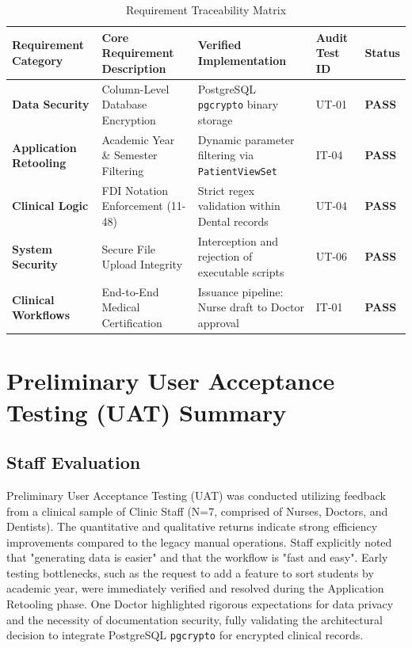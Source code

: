 \begin{table}[htbp]
\centering
\caption{Requirement Traceability Matrix}
\begin{tabular}{|p{}|p{}|p{}|p{}|p{}|}
\hline
\textbf{Requirement Category} & \textbf{Core Requirement Description} & \textbf{Verified Implementation} & \textbf{Audit Test ID} & \textbf{Status} \\
\hline
\textbf{Data Security} & Column-Level Database Encryption & PostgreSQL \texttt{pgcrypto} binary storage & UT-01 & \textbf{PASS} \\
\hline
\textbf{Application Retooling} & Academic Year \& Semester Filtering & Dynamic parameter filtering via \texttt{PatientViewSet} & IT-04 & \textbf{PASS} \\
\hline
\textbf{Clinical Logic} & FDI Notation Enforcement (11-48) & Strict regex validation within Dental records & UT-04 & \textbf{PASS} \\
\hline
\textbf{System Security} & Secure File Upload Integrity & Interception and rejection of executable scripts & UT-06 & \textbf{PASS} \\
\hline
\textbf{Clinical Workflows} & End-to-End Medical Certification & Issuance pipeline: Nurse draft to Doctor approval & IT-01 & \textbf{PASS} \\
\hline
\end{tabular}
\end{table}

\section{Preliminary User Acceptance Testing (UAT) Summary}

\subsection{Staff Evaluation}
Preliminary User Acceptance Testing (UAT) was conducted utilizing feedback from a clinical sample of Clinic Staff (N=7, comprised of Nurses, Doctors, and Dentists). The quantitative and qualitative returns indicate strong efficiency improvements compared to the legacy manual operations. Staff explicitly noted that "generating data is easier" and that the workflow is "fast and easy". Early testing bottlenecks, such as the request to add a feature to sort students by academic year, were immediately verified and resolved during the Application Retooling phase. One Doctor highlighted rigorous expectations for data privacy and the necessity of documentation security, fully validating the architectural decision to integrate PostgreSQL \texttt{pgcrypto} for encrypted clinical records.

